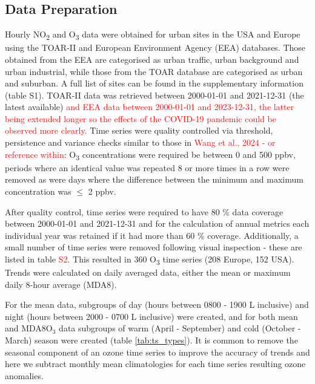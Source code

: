 \documentclass[journal abbreviation, manuscript]{copernicus}
\begin{document}
\subsection{Data Preparation} \label{sect:data_prep}
Hourly NO\textsubscript{2} and O\textsubscript{3} data were obtained for urban sites in the USA and Europe using the TOAR-II \citep{toar_db} and European Environment Agency (EEA) \citep{eea_1, eea_2} databases. Those obtained from the EEA are categorised as urban traffic, urban background and urban industrial, while those from the TOAR database are categorised as urban and suburban. A full list of sites can be found in the supplementary information (table S1).  TOAR-II data was retrieved between 2000-01-01 and 2021-12-31 (the latest available) \textcolor{red}{and EEA data between 2000-01-01 and 2023-12-31, the latter being extended longer so the effects of the COVID-19 pandemic could be observed more clearly.} Time series were quality controlled via threshold, persistence and variance checks similar to those in \textcolor{red}{Wang et al., 2024 - or reference within}: O\textsubscript{3} concentrations were required be between 0 and 500 ppbv, periods where an identical value was repeated 8 or more times in a row were removed as were days where the difference between the minimum and maximum concentration was $\leq$ 2 ppbv. 

After quality control, time series were required to have 80 \% data coverage between 2000-01-01 and 2021-12-31 and for the calculation of annual metrics each individual year was retained if it had more than 60 \% coverage. Additionally, a small number of time series were removed following visual inspection - these are listed in table \textcolor{red}{S2}. This resulted in 360 O\textsubscript{3} time series (208 Europe, 152 USA). Trends were calculated on daily averaged data, either the mean or maximum daily 8-hour average (MDA8). 

For the mean data, subgroups of day (hours between 0800 - 1900 L inclusive) and night (hours between 2000 - 0700 L inclusive) were created, and for both mean and MDA8O$_3$ data subgroups of warm (April - September) and cold (October - March) season were created (table \ref{tab:ts_types}). It is common to remove the seasonal component of an ozone time series to improve the accuracy of trends \citep{cooper_2020} and here we subtract monthly mean climatologies for each time series resulting ozone anomalies. 
\end{document}

